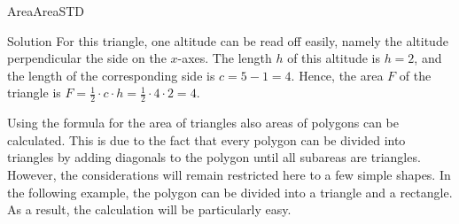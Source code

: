 \begin{MXContent}{Area}{Area}{STD}
\begin{MExercise}
\begin{center}
\end{center}

\begin{MHint}{Solution}
For this triangle, one altitude can be read off easily, namely the altitude perpendicular  
the side on the $x$-axes. The length $h$ of this altitude is $h = 2$,
and the length of the corresponding side is $c = 5 - 1 = 4$. Hence, the area $F$ of the 
triangle is 
$F = \frac{1}{2} \cdot c \cdot h = \frac{1}{2} \cdot 4 \cdot 2 = 4$.
\end{MHint}
\end{MExercise}

Using the formula for the area of triangles also areas of polygons can be 
calculated. This is due to the fact that every polygon can be divided into 
triangles by adding diagonals to the polygon until all subareas are triangles. However, 
the considerations will remain restricted here to a few simple shapes. In the
following example, the polygon can be divided into a triangle and a rectangle. 
As a result, the calculation will be particularly easy. 


\end{MXContent}
